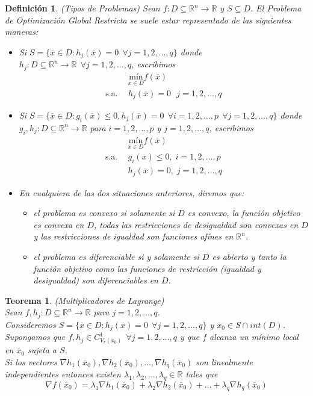 \documentclass[11pt]{report}
\newtheorem{definition}{Definición}[section]
\newtheorem{theorem}{Teorema}[section]
\newcommand{\Rn}{\mathbb{R}^{n}}
\newcommand{\R}{\mathbb{R}}
\newcommand{\x}{\overline{x}}
\newcommand{\xz}{\overline{x}_{0}}
\newcommand{\Sp}{1,2,\ldots, p}
\newcommand{\Sq}{1,2,\ldots, q}
\begin{document}
\begin{definition}{(Tipos de Problemas)}
Sean $f:D\subseteq\Rn\rightarrow\R$ y $S\subseteq D$. El Problema de Optimización Global Restricta se suele estar representado de las siguientes maneras:
\begin{itemize}
\item[(i)] Si $S=\{\x\in D: h_{j}(\x)=0\ \ \forall j=\Sq\}$ donde $h_{j}:D\subseteq\Rn\rightarrow\R\ \ \forall j = \Sq$, escribimos
\begin{equation*}
\begin{aligned}
& \underset{\x\in D}{\text{mín}} f(\x) \\
\text{s.a.}\ \ & h_j(\x)=0\ \ \ j=\Sq
\end{aligned}
\end{equation*}
\item[(ii)] Si $S=\{\x\in D:g_{i}(\x)\leq0, h_{j}(\x)=0\ \ \forall i=\Sp\ \ \forall j=\Sq\}$ donde $g_{i}, h_{j}:D\subseteq\Rn\rightarrow\R$ para $i=\Sp$ y $j=\Sq$, escribimos
\begin{equation*}
\begin{aligned}
& \underset{\x\in D}{\text{mín}} f(\x) \\
\text{s.a.}\ \
& g_i(\x) \leq 0, \; i = \Sp \\
& h_j(\x)=0, \; j=\Sq
\end{aligned}
\end{equation*}
\item[(iii)] En cualquiera de las dos situaciones anteriores, diremos que:
\begin{itemize}
\item el problema es \emph{convexo} si solamente si $D$ es convexo, la función objetivo es convexa en $D$, todas las restricciones de desigualdad son convexas en $D$ y las restricciones de igualdad son funciones afínes en $\Rn$.
\item el problema es \emph{diferenciable} si y solamente si $D$ es abierto y tanto la función objetivo como las funciones de restricción (igualdad y desigualdad) son diferenciables en $D$.
\end{itemize}
\end{itemize}
\end{definition}

\begin{theorem}{(Multiplicadores de Lagrange)}\\
Sean $f, h_{j}:D\subseteq\Rn\rightarrow\R$ para $j=\Sq$.\\
Consideremos $S=\{\x\in D: h_{j}(\x)=0\ \ \forall j=\Sq\}$ y $\xz\in S\cap int(D)$.\\
Supongamos que $f, h_{j}\in C_{V_{r}(\xz)}^{1}\ \ \forall j=\Sq$ y que $f$ alcanza un mínimo local en $\xz$ sujeta a $S$.\\
Si los vectores $\nabla h_{1}(\xz), \nabla h_{2}(\xz),\ldots,\nabla h_{q}(\xz)$ son linealmente independientes entonces existen $\lambda_{1},\lambda_{2},\ldots,\lambda_{q}\in\R$ tales que $$\nabla f(\xz)=\lambda_{1}\nabla h_{1}(\xz)+\lambda_{2}\nabla h_{2}(\xz)+\ldots+\lambda_{q}\nabla h_{q}(\xz)$$
\end{theorem}
\end{document}
